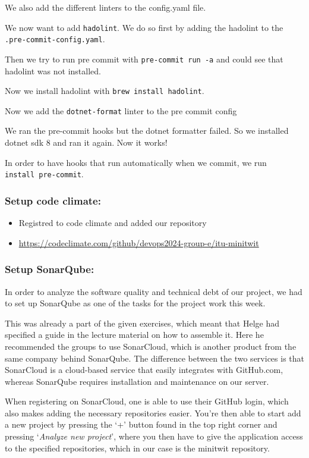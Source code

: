 We also add the different linters to the config.yaml file.

We now want to add \texttt{hadolint}. We do so first by adding the
hadolint to the \texttt{.pre-commit-config.yaml}.

Then we try to run pre commit with \texttt{pre-commit\ run\ -a} and
could see that hadolint was not installed.

Now we install hadolint with \texttt{brew\ install\ hadolint}.

Now we add the \texttt{dotnet-format} linter to the pre commit config

We ran the pre-commit hooks but the dotnet formatter failed. So we
installed dotnet sdk 8 and ran it again. Now it works!

In order to have hooks that run automatically when we commit, we run
\texttt{install\ pre-commit}.

\subsubsection{Setup code climate:}
\label{log:setup-code-climate}

\begin{itemize}
    \item Registred to code climate and added our repository
    \item \url{https://codeclimate.com/github/devops2024-group-e/itu-minitwit}
\end{itemize}

\subsubsection{Setup SonarQube:}
\label{log:setup-sonarqube}

In order to analyze the software quality and technical debt of our project, we had to set up SonarQube as one of the tasks for the project work this week.

This was already a part of the given exercises, which meant that Helge had specified a guide in the lecture material on how to assemble it. Here he recommended the groups to use SonarCloud, which is another product from the same company behind SonarQube. The difference between the two services is that SonarCloud is a cloud-based service that easily integrates with GitHub.com, whereas SonarQube requires installation and maintenance on our server.

When registering on SonarCloud, one is able to use their GitHub login, which also makes adding the necessary repositories easier. You're then able to start add a new project by pressing the `+' button found in the top right corner and pressing `\emph{Analyze new project}', where you then have to give the application access to the specified repositories, which in our case is the minitwit repository.

